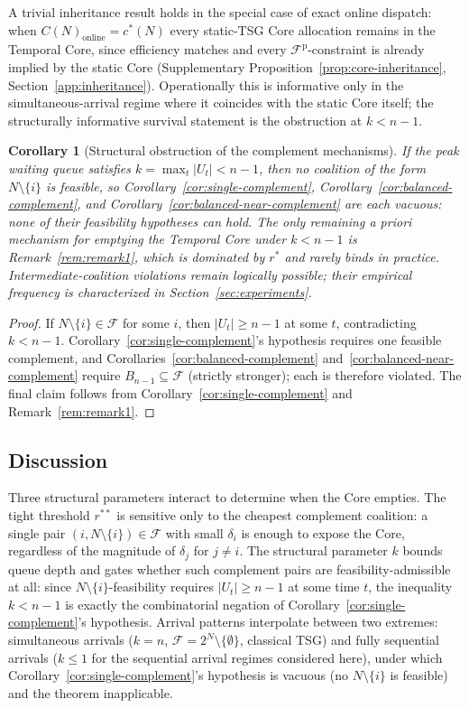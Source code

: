 \documentclass[11pt]{article}
\theoremstyle{plain}
\newtheorem{corollary}[theorem]{Corollary}
\theoremstyle{definition}
\theoremstyle{remark}
\newcommand{\F}{\mathcal{F}}
\newcommand{\Fp}{\mathcal{F}^{\mathrm{p}}}
\newcommand{\cstar}{c^{\ast}}
\begin{document}
A trivial inheritance result holds in the special case of exact online dispatch: when $C(N)_{\text{online}}=\cstar(N)$ every static-TSG Core allocation remains in the Temporal Core, since efficiency matches and every $\Fp$-constraint is already implied by the static Core (Supplementary Proposition~\ref{prop:core-inheritance}, Section~\ref{app:inheritance}). Operationally this is informative only in the simultaneous-arrival regime where it coincides with the static Core itself; the structurally informative survival statement is the obstruction at $k<n-1$.

\begin{corollary}[Structural obstruction of the complement mechanisms]
\label{cor:cor52}
If the peak waiting queue satisfies $k=\max_t |U_t| < n-1$, then no coalition of the form $N\setminus\{i\}$ is feasible, so Corollary~\ref{cor:single-complement}, Corollary~\ref{cor:balanced-complement}, and Corollary~\ref{cor:balanced-near-complement} are each vacuous: none of their feasibility hypotheses can hold. The only remaining \emph{a priori} mechanism for emptying the Temporal Core under $k<n-1$ is Remark~\ref{rem:remark1}, which is dominated by $r^{\ast}$ and rarely binds in practice. Intermediate-coalition violations remain logically possible; their empirical frequency is characterized in Section~\ref{sec:experiments}.
\end{corollary}

\begin{proof}
If $N\setminus\{i\}\in\F$ for some $i$, then $|U_t|\ge n-1$ at some $t$, contradicting $k<n-1$. Corollary~\ref{cor:single-complement}'s hypothesis requires one feasible complement, and Corollaries~\ref{cor:balanced-complement} and~\ref{cor:balanced-near-complement} require $B_{n-1}\subseteq\F$ (strictly stronger); each is therefore violated. The final claim follows from Corollary~\ref{cor:single-complement} and Remark~\ref{rem:remark1}.
\end{proof}

\subsection{Discussion}
\label{ssec:discussion}

Three structural parameters interact to determine when the Core empties. The tight threshold $r^{\ast\ast}$ is sensitive only to the cheapest complement coalition: a single pair $(i,N\setminus\{i\})\in\F$ with small $\delta_i$ is enough to expose the Core, regardless of the magnitude of $\delta_j$ for $j\neq i$. The structural parameter $k$ bounds queue depth and gates whether such complement pairs are feasibility-admissible at all: since $N\setminus\{i\}$-feasibility requires $|U_t|\ge n-1$ at some time $t$, the inequality $k<n-1$ is exactly the combinatorial negation of Corollary~\ref{cor:single-complement}'s hypothesis. Arrival patterns interpolate between two extremes: simultaneous arrivals ($k=n$, $\F=2^N\setminus\{\emptyset\}$, classical TSG) and fully sequential arrivals ($k\le 1$ for the sequential arrival regimes considered here), under which Corollary~\ref{cor:single-complement}'s hypothesis is vacuous (no $N\setminus\{i\}$ is feasible) and the theorem inapplicable.
\end{document}
